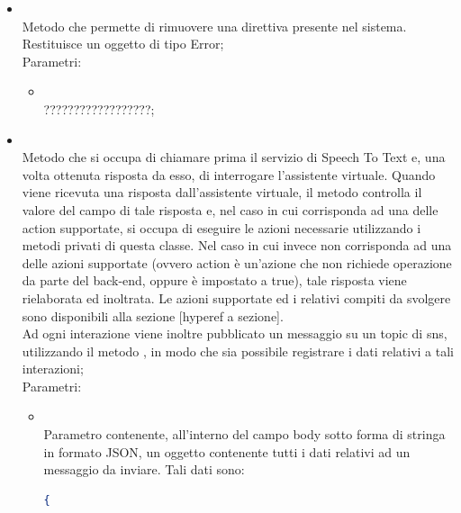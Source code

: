 \begin{itemize}
\begin{itemize}
\begin{itemize}
			?????????????????;
		\end{itemize}
		\item[]  \\
		Metodo che permette di rimuovere una direttiva presente nel sistema. Restituisce un oggetto di tipo Error;\\
		Parametri:
		\begin{itemize}
			\item {} \\
			??????????????????;
		\end{itemize}
		\item[]  \\
		Metodo che si occupa di chiamare prima il servizio di Speech To Text e, una volta ottenuta risposta da esso, di interrogare l'assistente virtuale. Quando viene ricevuta una risposta dall'assistente virtuale, il metodo controlla il valore del campo  di tale risposta e, nel caso in cui corrisponda ad una delle action supportate, si occupa di eseguire le azioni necessarie utilizzando i metodi privati di questa classe. Nel caso in cui invece  non corrisponda ad una delle azioni supportate (ovvero action è un'azione che non richiede operazione da parte del back-end, oppure  è impostato a true), tale risposta viene rielaborata ed inoltrata. Le azioni supportate ed i relativi compiti da svolgere sono disponibili alla sezione [hyperef a sezione]. \\
Ad ogni interazione viene inoltre pubblicato un messaggio su un topic di sns, utilizzando il metodo , in modo che sia possibile registrare i dati relativi a tali interazioni;\\
		Parametri:
		\begin{itemize}
			\item {} \\
			Parametro contenente, all'interno del campo body sotto forma di stringa in formato JSON, un oggetto contenente tutti i dati relativi ad un messaggio da inviare. Tali dati sono:
\begin{lstlisting}[language=json,firstnumber=1]
{


\end{lstlisting}
\end{itemize}
\end{itemize}
\end{itemize}
